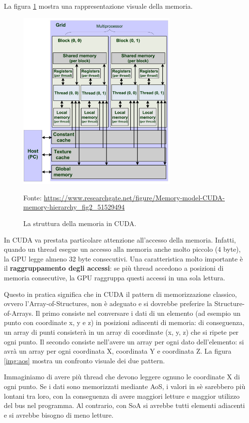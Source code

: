 \documentclass[12pt,a4paper,openright,twoside]{report}
\newcommand{\source}[1]{\vspace{-10pt} \caption*{\scriptsize Fonte: {#1}} }
\begin{document}
La figura \ref{img:memory-hierarchy} mostra una rappresentazione visuale della memoria.

\begin{figure}[h]
    \centering
    \includegraphics[width=8cm]{cuda-memory-hierarchy.jpg}
    \caption{La struttura della memoria in CUDA.}
    \source{\url{https://www.researchgate.net/figure/Memory-model-CUDA-memory-hierarchy_fig2_51529494}}
    \label{img:memory-hierarchy}
\end{figure}

In CUDA va prestata particolare attenzione all'accesso della memoria. Infatti, quando un thread esegue un accesso alla memoria anche molto piccolo (4 byte), la GPU legge almeno 32 byte consecutivi. Una caratteristica molto importante è il \textbf{raggruppamento degli accessi}: se più thread accedono a posizioni di memoria consecutive, la GPU raggruppa questi accessi in una sola lettura.

Questo in pratica significa che in CUDA il pattern di memorizzazione classico, ovvero l'Array-of-Structures, non è adeguato e si dovrebbe preferire la Structure-of-Arrays. Il primo consiste nel conversare i dati di un elemento (ad esempio un punto con coordinate x, y e z) in posizioni adiacenti di memoria: di conseguenza, un array di punti consisterà in un array di coordinate (x, y, z) che si ripete per ogni punto. Il secondo consiste nell'avere un array per ogni dato dell'elemento: si avrà un array per ogni coordinata X, coordinata Y e coordinata Z. La figura \ref{img:aos} mostra un confronto visuale dei due pattern.

Immaginiamo di avere più thread che devono leggere ognuno le coordinate X di ogni punto. Se i dati sono memorizzati mediante AoS, i valori in sè sarebbero più lontani tra loro, con la conseguenza di avere maggiori letture e maggior utilizzo del bus nel programma. Al contrario, con SoA si avrebbe tutti elementi adiacenti e si avrebbe bisogno di meno letture.
\end{document}
